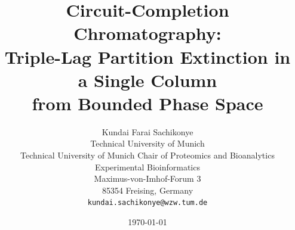 \documentclass[twocolumn,10pt,a4paper]{article}
\theoremstyle{definition}
\theoremstyle{remark}
\begin{document}
\title{\textbf{Circuit-Completion Chromatography: \\
Triple-Lag Partition Extinction in a Single Column \\
from Bounded Phase Space}}

\author{
Kundai Farai Sachikonye\\
Technical University of Munich\\
Technical University of Munich Chair of Proteomics and Bioanalytics \\
Experimental Bioinformatics \\
Maximus-von-Imhof-Forum 3\\
85354 Freising, Germany\\
\texttt{kundai.sachikonye@wzw.tum.de}
}

\date{\today}

\maketitle
\end{document}

